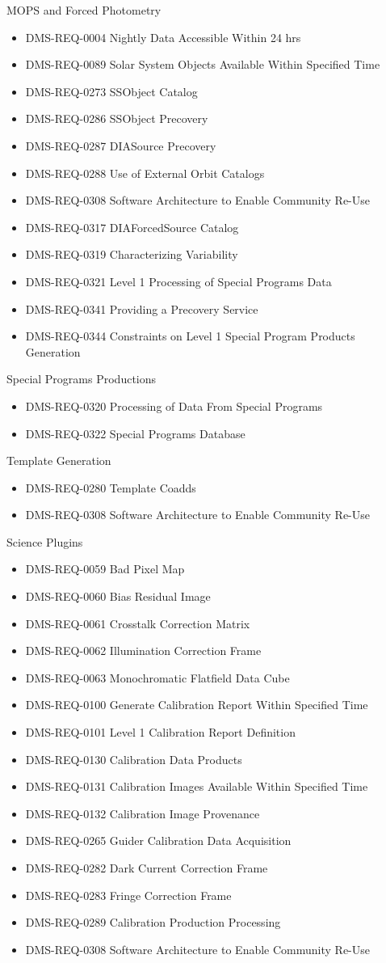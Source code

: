 MOPS and Forced Photometry \begin{itemize}
\item DMS-REQ-0004 Nightly Data Accessible Within 24 hrs
\item DMS-REQ-0089 Solar System Objects Available Within Specified Time
\item DMS-REQ-0273 SSObject Catalog
\item DMS-REQ-0286 SSObject Precovery
\item DMS-REQ-0287 DIASource Precovery
\item DMS-REQ-0288 Use of External Orbit Catalogs
\item DMS-REQ-0308 Software Architecture to Enable Community Re-Use
\item DMS-REQ-0317 DIAForcedSource Catalog
\item DMS-REQ-0319 Characterizing Variability
\item DMS-REQ-0321 Level 1 Processing of Special Programs Data
\item DMS-REQ-0341 Providing a Precovery Service
\item DMS-REQ-0344 Constraints on Level 1 Special Program Products Generation
\end{itemize}
Special Programs Productions \begin{itemize}
\item DMS-REQ-0320 Processing of Data From Special Programs
\item DMS-REQ-0322 Special Programs Database
\end{itemize}
Template Generation \begin{itemize}
\item DMS-REQ-0280 Template Coadds
\item DMS-REQ-0308 Software Architecture to Enable Community Re-Use
\end{itemize}
Science Plugins \begin{itemize}
\item DMS-REQ-0059 Bad Pixel Map
\item DMS-REQ-0060 Bias Residual Image
\item DMS-REQ-0061 Crosstalk Correction Matrix
\item DMS-REQ-0062 Illumination Correction Frame
\item DMS-REQ-0063 Monochromatic Flatfield Data Cube
\item DMS-REQ-0100 Generate Calibration Report Within Specified Time
\item DMS-REQ-0101 Level 1 Calibration Report Definition
\item DMS-REQ-0130 Calibration Data Products
\item DMS-REQ-0131 Calibration Images Available Within Specified Time
\item DMS-REQ-0132 Calibration Image Provenance
\item DMS-REQ-0265 Guider Calibration Data Acquisition
\item DMS-REQ-0282 Dark Current Correction Frame
\item DMS-REQ-0283 Fringe Correction Frame
\item DMS-REQ-0289 Calibration Production Processing
\item DMS-REQ-0308 Software Architecture to Enable Community Re-Use
\end{itemize}
